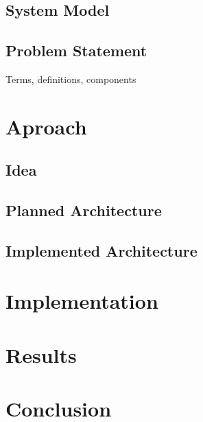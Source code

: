 \documentclass[11pt, journal]{IEEEtran}
\begin{document}
	\subsection{System Model}

	\subsection{Problem Statement}
	Terms, definitions, components

\section{Aproach}

	\subsection{Idea}

	\subsection{Planned Architecture}

	\subsection{Implemented Architecture}

\section{Implementation}

\section{Results}

\section{Conclusion}
\end{document}
